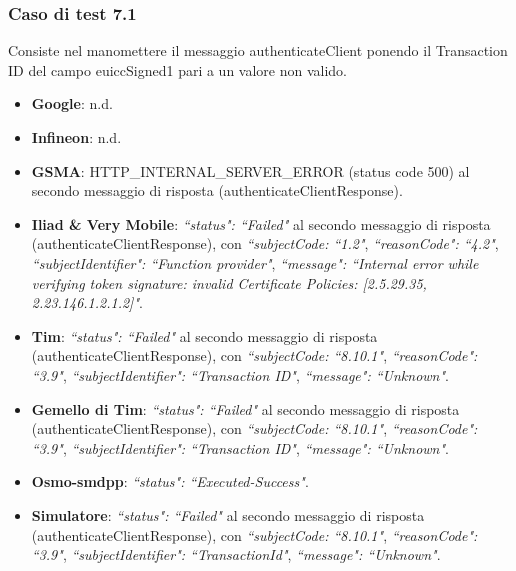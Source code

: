 \documentclass[10pt, oneside]{book}
\begin{document}
\subsubsection{Caso di test 7.1}
Consiste nel manomettere il messaggio authenticateClient ponendo il Transaction ID del campo euiccSigned1 pari a un valore non valido.
\begin{itemize}
\item \textbf{Google}: n.d.
\item \textbf{Infineon}: n.d.
\item \textbf{GSMA}: HTTP\_INTERNAL\_SERVER\_ERROR (status code 500) al secondo messaggio di risposta (authenticateClientResponse).
\item \textbf{Iliad \& Very Mobile}: \textit{``status": ``Failed"} al secondo messaggio di risposta (authenticateClientResponse), con \textit{``subjectCode: ``1.2"}, \textit{``reasonCode": ``4.2"}, \textit{``subjectIdentifier": ``Function provider"}, \textit{``message": ``Internal error while verifying token signature: invalid Certificate Policies: [2.5.29.35, 2.23.146.1.2.1.2]"}.
\item \textbf{Tim}: \textit{``status": ``Failed"} al secondo messaggio di risposta (authenticateClientResponse), con \textit{``subjectCode: ``8.10.1"}, \textit{``reasonCode": ``3.9"}, \textit{``subjectIdentifier": ``Transaction ID"}, \textit{``message": ``Unknown"}.
\item \textbf{Gemello di Tim}: \textit{``status": ``Failed"} al secondo messaggio di risposta (authenticateClientResponse), con \textit{``subjectCode: ``8.10.1"}, \textit{``reasonCode": ``3.9"}, \textit{``subjectIdentifier": ``Transaction ID"}, \textit{``message": ``Unknown"}.
\item \textbf{Osmo-smdpp}: \textit{``status": ``Executed-Success"}.
\item \textbf{Simulatore}: \textit{``status": ``Failed"} al secondo messaggio di risposta (authenticateClientResponse), con \textit{``subjectCode: ``8.10.1"}, \textit{``reasonCode": ``3.9"}, \textit{``subjectIdentifier": ``TransactionId"}, \textit{``message": ``Unknown"}.
\end{itemize}
\end{document}
